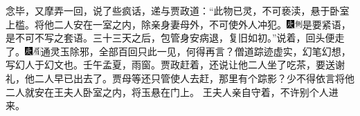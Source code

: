 念毕，又摩弄一回，说了些疯话，递与贾政道：“此物已灵，不可亵渎，悬于卧室上槛。将他二人安在一室之内，除亲身妻母外，不可使外人冲犯。{\includegraphics[width=3mm]{../Images/00004}\includegraphics[width=3mm]{../Images/00011}\footnotesize \kaishu 是要紧语，是不可不写之套语。}三十三天之后，包管身安病退，复旧如初。”说着，回头便走了。{\includegraphics[width=3mm]{../Images/00004}\includegraphics[width=3mm]{../Images/00010}\footnotesize \kaishu 通灵玉除邪，全部百回只此一见，何得再言？僧道踪迹虚实，幻笔幻想，写幻人于幻文也。壬午孟夏，雨窗。}贾政赶着，还说让他二人坐了吃茶，要送谢礼，他二人早已出去了。贾母等还只管使人去赶，那里有个踪影？少不得依言将他二人就安在王夫人卧室之内，将玉悬在门上。
王夫人亲自守着，不许别个人进来。

